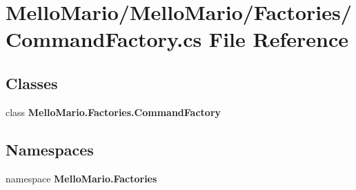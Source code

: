 \section{Mello\+Mario/\+Mello\+Mario/\+Factories/\+Command\+Factory.cs File Reference}
\label{CommandFactory_8cs}
\subsection*{Classes}
\begin{DoxyCompactItemize}
\item 
class \textbf{ Mello\+Mario.\+Factories.\+Command\+Factory}
\end{DoxyCompactItemize}
\subsection*{Namespaces}
\begin{DoxyCompactItemize}
\item 
namespace \textbf{ Mello\+Mario.\+Factories}
\end{DoxyCompactItemize}
